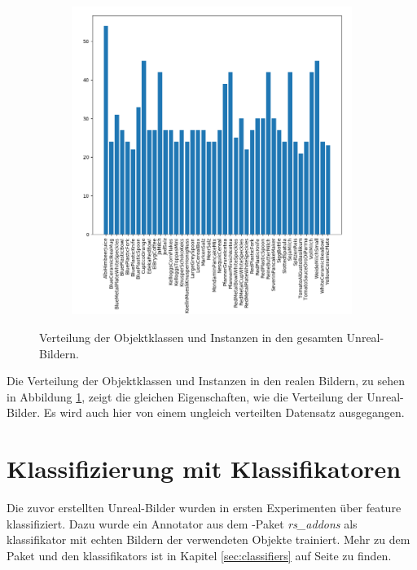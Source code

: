 \begin{figure}
\begin{subfigure}[b]{0.58\textwidth}
		\includegraphics[scale=.4]{img/chapter6/RealGTInstance_analysis.png}	
	\end{subfigure}
\caption[Verteilung der Objekte in den Unreal-Bildern]{Verteilung der Objektklassen und Instanzen in den gesamten Unreal-Bildern.}
\label{fig:Real-Images_analysis}
\end{figure}

Die Verteilung der Objektklassen und Instanzen in den realen Bildern, zu sehen in Abbildung \ref{fig:Real-Images_analysis}, zeigt die gleichen Eigenschaften, wie die Verteilung der Unreal-Bilder. Es wird auch hier von einem ungleich verteilten Datensatz ausgegangen. 

\section{Klassifizierung mit Klassifikatoren}
\label{sec:classificationExperiment}
Die zuvor erstellten Unreal-Bilder wurden in ersten Experimenten über \gls{feature} klassifiziert. Dazu wurde ein Annotator aus dem \robosherlock-Paket \textit{rs\_addons} als \gls{klassifikator} mit echten Bildern der verwendeten Objekte trainiert. Mehr zu dem Paket und den \glspl{klassifikator} ist in Kapitel \ref{sec:classifiers} auf Seite \pageref{sec:classifiers} zu finden. \par

